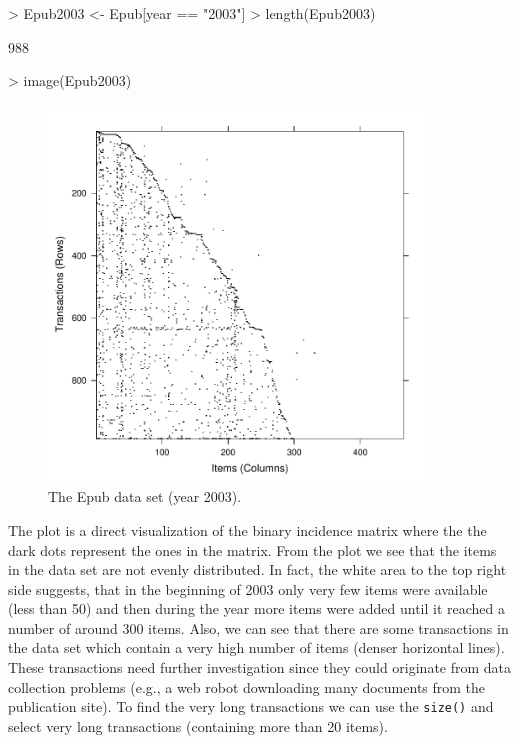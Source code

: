 \documentclass[10pt,a4paper]{article}
\newcommand{\func}[1]{\mbox{\texttt{#1()}}}
\begin{document}
\begin{Schunk}
\begin{Sinput}
> Epub2003 <- Epub[year == "2003"]
> length(Epub2003)
\end{Sinput}
\begin{Soutput}
[1] 988
\end{Soutput}
\begin{Sinput}
> image(Epub2003)
\end{Sinput}
\end{Schunk}
\begin{figure}
\centering
\includegraphics[width=10cm]{arules-epub}
\caption{The Epub data set (year 2003).}
\label{fig:imageEpub}
\end{figure}

The plot is a direct visualization of the binary incidence matrix where
the the dark dots represent the ones in the matrix.  From the plot we
see that the items in the data set are not evenly distributed.  In fact,
the white area to the top right side suggests, that in the beginning of
2003 only very few items were available (less than 50) and then during
the year more items were added until it reached a number of around 300
items. Also, we can see that there are some transactions in the data set
which contain a very high number of items (denser horizontal lines).
These transactions need further investigation since they could originate
from data collection problems (e.g., a web robot downloading many
documents from the publication site).  To find the very long
transactions we can use the \func{size} and select very long
transactions (containing more than 20 items).
\end{document}
